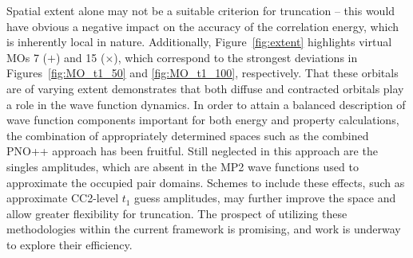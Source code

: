 Spatial extent alone may not be a suitable criterion for truncation -- 
this would have obvious a negative impact on the accuracy of the 
correlation energy, which is inherently local in nature. 
Additionally, Figure~\ref{fig:extent} highlights virtual MOs 7 
($\boldsymbol{+}$) and 15 ($\boldsymbol{\times}$),
which correspond to the strongest deviations in 
Figures~\ref{fig:MO_t1_50} and \ref{fig:MO_t1_100}, respectively.
That these orbitals are of varying extent
demonstrates that both diffuse and contracted orbitals play a role in 
the wave function dynamics.
In order to attain a balanced description of wave function components 
important for both energy and property calculations, the combination 
of appropriately determined spaces such as the combined PNO++ approach
has been fruitful. Still neglected in this approach
are the singles amplitudes, which are absent in the MP2 wave functions
used to approximate the occupied pair domains. Schemes to include 
these effects, such as approximate CC2-level $t_1$ guess amplitudes,
may further improve the space and allow greater flexibility for 
truncation. The prospect of utilizing these 
methodologies within the current framework is promising, and work is 
underway to explore their efficiency.
